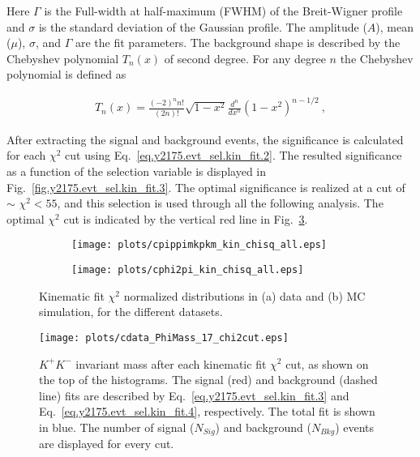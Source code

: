 \noindent Here $\Gamma$ is the Full-width at half-maximum (FWHM) of the Breit-Wigner profile and $\sigma$ is the standard deviation of the Gaussian profile. The amplitude ($A$), mean ($\mu$),  $\sigma$, and $\Gamma$ are the fit parameters. The background shape is described by the Chebyshev polynomial $T_n(x)$ of second degree. For any degree $n$ the Chebyshev polynomial is defined as
 
\begin{equation}
    \label{eq.y2175.evt_sel.kin_fit.4}
    \begin{aligned}
        T_n(x) = \frac{(-2)^{n}n!}{(2n)!}\sqrt{1-x^2}\frac{d^n}{dx^n}(1-x^2)^{n-1/2}~,
    \end{aligned}
\end{equation}

After extracting the signal and background events, the significance is calculated for each $\chi^{2}$ cut using Eq.~\ref{eq.y2175.evt_sel.kin_fit.2}. The resulted significance as a function of the selection variable is displayed in Fig.~\ref{fig.y2175.evt_sel.kin_fit.3}. The optimal significance is realized at a cut of $\sim$ $\chi^2<55$, and this selection is used through all the following analysis. The optimal $\chi^{2}$ cut is indicated by the vertical red line in Fig.~\ref{fig.y2175.evt_sel.kin_fit.1}.

\begin{figure}[H]
    \centering
    \begin{subfigure}[b]{0.5\textwidth}
        \texttt{[image: plots/cpippimkpkm\_kin\_chisq\_all.eps]}
        \caption{}
        \label{fig.y2175.evt_sel.kin_fit.1.a}
    \end{subfigure}\hfill
    \begin{subfigure}[b]{0.5\textwidth}
        \texttt{[image: plots/cphi2pi\_kin\_chisq\_all.eps]}
        \caption{}
        \label{fig.y2175.evt_sel.kin_fit.1.b}
    \end{subfigure}
    \caption{Kinematic fit $\chi^2$ normalized distributions in (a) data and (b) MC simulation, for the different datasets.}
    \label{fig.y2175.evt_sel.kin_fit.1}
\end{figure}

\begin{figure}[H]
    \centering
        \texttt{[image: plots/cdata\_PhiMass\_17\_chi2cut.eps]}
        \caption{$K^+K^-$ invariant mass after each kinematic fit $\chi^2$ cut, as shown on the top of the histograms. The signal (red) and background (dashed line) fits are described by Eq.~\ref{eq.y2175.evt_sel.kin_fit.3} and Eq.~\ref{eq.y2175.evt_sel.kin_fit.4}, respectively. The total fit is shown in blue. The number of signal ($N_{Sig}$) and background ($N_{Bkg}$) events are displayed for every cut.}
        \label{fig.y2175.evt_sel.kin_fit.2}
\end{figure}

